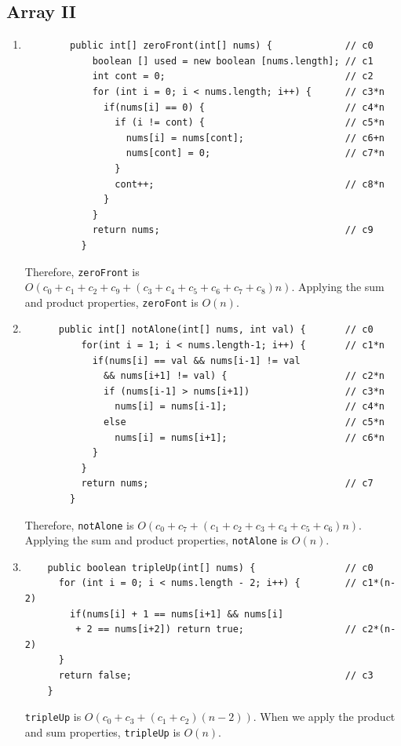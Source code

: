 \documentclass[a4paper,12pt]{article}
\begin{document}
  \subsection{Array II}
    \begin{enumerate}
      \item \begin{Verbatim}
        public int[] zeroFront(int[] nums) {             // c0
            boolean [] used = new boolean [nums.length]; // c1
            int cont = 0;                                // c2
            for (int i = 0; i < nums.length; i++) {      // c3*n
              if(nums[i] == 0) {                         // c4*n
                if (i != cont) {                         // c5*n
                  nums[i] = nums[cont];                  // c6+n
                  nums[cont] = 0;                        // c7*n
                }
                cont++;                                  // c8*n
              }
            }
            return nums;                                 // c9
          }
      \end{Verbatim}
      Therefore, \texttt{zeroFront} is $O(c_0+c_1+c_2+c_9+(c_3+c_4+c_5+c_6+c_7+c_8)n)$.
      Applying the sum and product properties, \texttt{zeroFont} is $O(n)$.

      \item \begin{Verbatim}
      public int[] notAlone(int[] nums, int val) {       // c0
          for(int i = 1; i < nums.length-1; i++) {       // c1*n
            if(nums[i] == val && nums[i-1] != val
              && nums[i+1] != val) {                     // c2*n
              if (nums[i-1] > nums[i+1])                 // c3*n
                nums[i] = nums[i-1];                     // c4*n
              else                                       // c5*n
                nums[i] = nums[i+1];                     // c6*n
            }
          }
          return nums;                                   // c7
        }
    \end{Verbatim}
    Therefore, \texttt{notAlone} is $O(c_0+c_7+(c_1+c_2+c_3+c_4+c_5+c_6)n)$.
    Applying the sum and product properties, \texttt{notAlone} is $O(n)$.

    \item \begin{Verbatim}
    public boolean tripleUp(int[] nums) {                // c0
      for (int i = 0; i < nums.length - 2; i++) {        // c1*(n-2)
        if(nums[i] + 1 == nums[i+1] && nums[i]
         + 2 == nums[i+2]) return true;                  // c2*(n-2)
      }
      return false;                                      // c3
    }
    \end{Verbatim}
    \texttt{tripleUp} is $O(c_0+c_3+(c_1+c_2)(n-2))$. When we apply the product
    and sum properties, \texttt{tripleUp} is $O(n)$.


\end{enumerate}
\end{document}
